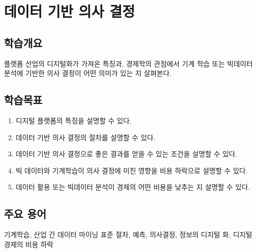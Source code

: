 \chapter{데이터 기반 의사 결정}\label{cha:databaseddecision}

\section*{학습개요}
 플랫폼 산업의 디지털화가 가져온 특징과, 경제학의 관점에서 기계 학습 또는 빅데이터 분석에 기반한 의사 결정이 어떤 의미가 있는 지 살펴본다.


\section*{학습목표}
\begin{enumerate}
\item 디지털 플랫폼의 특징을 설명할 수 있다.
\item 데이터 기반 의사 결정의 절차를 설명할 수 있다.
\item 데이터 기반 의사 결정으로 좋은 결과를 얻을 수 있는 조건을 설명할 수 있다.
\item 빅 데이터와 기계학습이 의사 결정에 미친 영향을 비용 하락으로 설명할 수 있다.
\item 데이터 활용 또는 빅데이터 분석이 경제의 어떤 비용을 낮추는 지 설명할 수 있다.
\end{enumerate}

\section*{주요 용어}
기계학습, 산업 간 데이터 마이닝 표준 절차, 예측, 의사결정, 정보의 디지털 화, 디지털 경제의 비용 하락

\pagebreak

